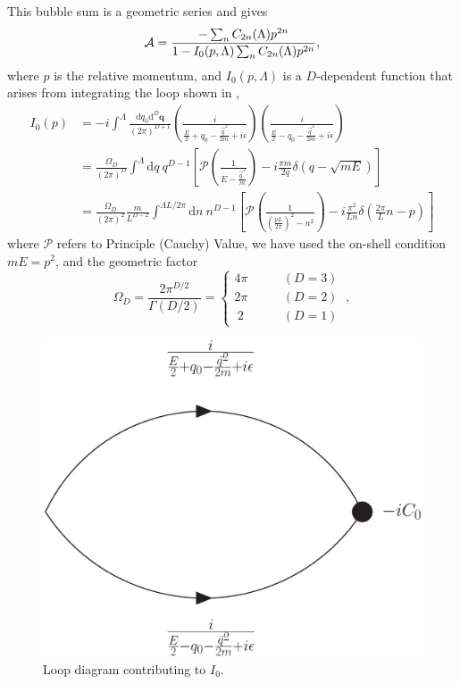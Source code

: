 This bubble sum is a geometric series and gives\cite{Kaplan:1998we,Beane:2003da}
\begin{equation}\label{eq:scattering amplitude}
\mathcal{A} = \frac{-\sum_n C_{2n}(\Lambda) p^{2n}}{1-I_0(p,\Lambda) \sum_n C_{2n}(\Lambda) p^{2n}},
\end{equation}
where $p$ is the relative momentum,  and $I_0(p,\Lambda)$ is a $D$-dependent function that arises from integrating the loop shown in ,
\begin{align}
    I_0(p)
    &=-i\int^\Lambda \frac { \mathrm {d}q_0 \mathrm { d } ^ { D } \mathbf { q } } { ( 2 \pi ) ^ { D+1 } } \left( \frac { i } { \frac{E}{2} + q _ { 0 } - \frac{\vec{q}^2}{2m} + i \epsilon } \right) \left( \frac { i } { \frac{E}{2} - q _ { 0 } - \frac{\vec{q}^2}{2m} + i \epsilon } \right)
    \nonumber\\
    &=\frac{\Omega_D}{(2\pi)^D}\int^\Lambda  \mathrm { d } q \ q^{D-1}\left[\mathcal{P} \left( \frac { 1 } { E - \frac{\vec{q}^2}{m} } \right)
-i\frac{\pi m}{2q}\delta(q-\sqrt{mE})\right]
    \label{eq:I0}
    \\
    &=\frac{\Omega_D}{(2\pi)^2}\frac{m}{L^{D-2}}\int^{\Lambda L/2\pi}  \mathrm { d } n \ n^{D-1}\left[\mathcal{P} \left( \frac { 1 } { \left(\frac{pL}{2\pi}\right)^2 - n^2 } \right)
-i\frac{\pi^2}{L n}\delta\left(\frac{2\pi}{L}n -p\right)\right]
\end{align}
where $\mathcal{P}$ refers to Principle (Cauchy) Value, we have used the on-shell condition $mE=p^2$, and the geometric factor
\begin{equation}
\Omega_D=\frac{2\pi^{D/2}}{\Gamma(D/2)}=
\begin{cases}
4\pi&\quad\quad (D=3)\\
2\pi&\quad\quad (D=2)\\
\ 2\ &\quad\quad (D=1)
\end{cases}\ ,
\end{equation}

\begin{figure}[h!]
\center
\includegraphics[width=.35\columnwidth]{figure/I0.eps}
\caption{Loop diagram contributing to $I_0$.\label{fig:I0} }
\end{figure}

